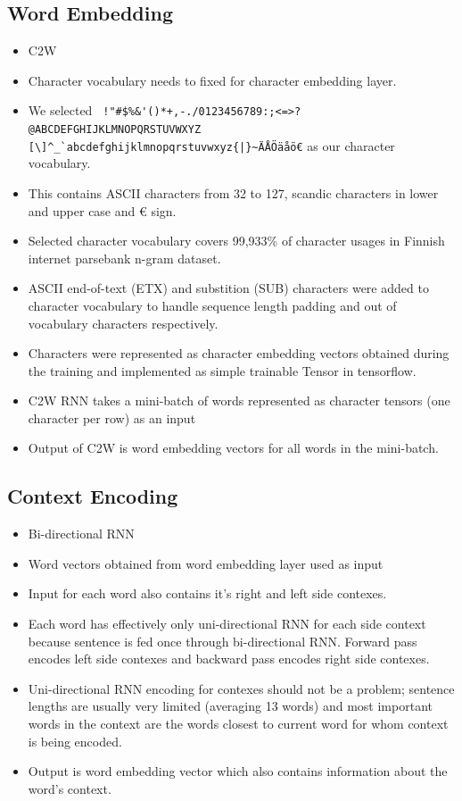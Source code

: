 \documentclass[12pt,a4paper,english
]{tutthesis}
\begin{document}
\subsection{Word Embedding}
\label{ss:word_embedding}
\begin{itemize}
\item C2W
\item Character vocabulary needs to fixed for character embedding layer.
\item We selected \verb£ !"#$%&'()*+,-./0123456789:;<=>?@ABCDEFGHIJKLMNOPQRSTUVWXYZ£ \verb£[\]^_`abcdefghijklmnopqrstuvwxyz{|}~ÄÅÖäåö€£ as our character vocabulary.
\item This contains ASCII characters from 32 to 127, scandic characters in lower and upper case and € sign.
\item Selected character vocabulary covers 99,933\% of character usages in Finnish internet parsebank n-gram dataset.
\item ASCII end-of-text (ETX) and substition (SUB) characters were added to character vocabulary to handle sequence length padding and out of vocabulary characters respectively.
\item Characters were represented as character embedding vectors obtained during the training and implemented as simple trainable Tensor in tensorflow.
\item C2W RNN takes a mini-batch of words represented as character tensors (one character per row) as an input
\item Output of C2W is word embedding vectors for all words in the mini-batch.
\end{itemize}

\subsection{Context Encoding}
\label{ss:context_encoding}
\begin{itemize}
\item Bi-directional RNN
\item Word vectors obtained from word embedding layer used as input
\item Input for each word also contains it's right and left side contexes.
\item Each word has effectively only uni-directional RNN for each side context because sentence is fed once through bi-directional RNN. Forward pass encodes left side contexes and backward pass encodes right side contexes.
\item Uni-directional RNN encoding for contexes should not be a problem; sentence lengths are usually very limited (averaging 13 words) and most important words in the context are the words closest to current word for whom context is being encoded.
\item Output is word embedding vector which also contains information about the word's context.
\end{itemize}
\end{document}
